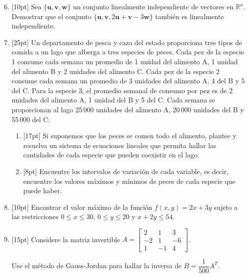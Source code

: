 \documentclass[11pt]{article}
\begin{document}
\begin{enumerate}
\setcounter{enumi}{5}
\item{}[10pt] Sea $\{\mathbf{u},\mathbf{v},\mathbf{w}\}$ un conjunto linealmente independiente de vectores en $\mathbb{R}^n$. Demostrar que el conjunto $\{\mathbf{u},\mathbf{v},2\mathbf{u}+\mathbf{v}-3\mathbf{w}\}$ también es linealmente independiente.

\vspace{6cm}

\item{}[25pt] Un departamento de pesca y caza del estado proporciona tres tipos de comida a un lago que alberga a tres especies de peces. Cada pez de la especie 1 consume cada semana un promedio de 1 unidad del alimento A, 1 unidad del alimento B y 2 unidades del alimento C. Cada pez de la especie 2 consume cada semana un promedio de 3 unidades del alimento A, 4 del B y 5 del C. Para la especie 3, el promedio semanal de consumo por pez es de 2 unidades del alimento A, 1 unidad del B y 5 del C. Cada semana se proporcionan al lago 25\,000 unidades del alimento A, 20\,000 unidades del B y 55\,000 del C.
\begin{enumerate}
\item{}[17pt] Si suponemos que los peces se comen todo el alimento, plantee y resuelva un sistema de ecuaciones lineales que permita hallar las cantidades de cada especie que pueden coexistir en el lago.

\vspace{6cm}

\item{}[8pt] Encuentre los intervalos de variación de cada variable, es decir, encuentre los valores máximos y mínimos de peces de cada especie que puede haber.

\vspace{4cm}
\end{enumerate}

\item{}[10pt] Encontrar el valor máximo de la función $f(x,y)=2x+3y$ sujeto a las restricciones $0\leq x\leq 30$, $0\leq y\leq 20$ y $x+2y\leq 54$.

\vspace{6cm}

\item{}[15pt] Considere la matriz invertible $A = \begin{bmatrix}2&1&3\\-2&1&-6\\1&-1&4\end{bmatrix}$.

Use el método de Gauss-Jordan para hallar la inversa de $B=\dfrac{1}{500}A^T$.
\end{enumerate}

\examfooter
\end{document}
